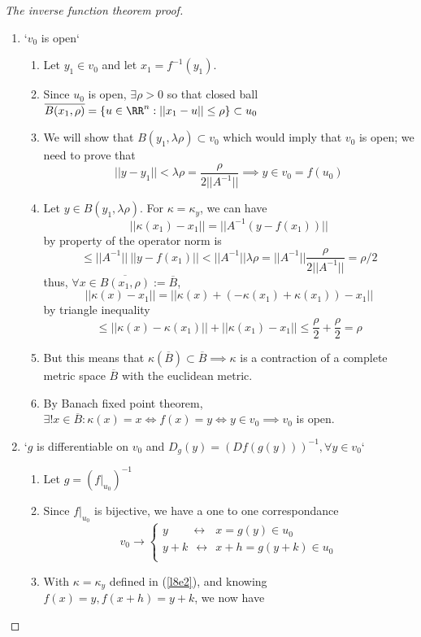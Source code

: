 \begin{proof}[The inverse function theorem proof]
\begin{enumerate}[I]
  \item `$v_0$ is open`
    \begin{enumerate}
    \item Let $y_1 \in v_0$ and let $x_1 = f^{-1}(y_1)$.
    \item Since $u_0$ is open, $\exists \rho > 0$ so that closed ball $\overline{B(x_1, \rho)} = \{u\in \RR^n:||x_1-u|| \leq \rho\} \subset u_0$
    \item We will show that $B(y_1, \lambda \rho) \subset v_0$ which would imply that $v_0$ is open; we need to prove that
      $$||y - y_1|| < \lambda \rho = \frac{\rho}{2||A^{-1}||} \implies y\in v_0 = f(u_0)$$
    \item Let $y \in B(y_1, \lambda \rho)$. For $\kappa = \kappa_y$, we can have
      $$||\kappa(x_1) - x_1|| = ||A^{-1}(y-f(x_1))||$$
      by property of the operator norm is
      $$\leq ||A^{-1}||\ ||y-f(x_1)|| < ||A^{-1}||\lambda \rho = ||A^{-1}||\frac{\rho}{2||A^{-1}||} = \rho / 2 $$
      thus, $\forall x \in \overline{B(x_1, \rho)} := \overline{B}$,
      $$||\kappa(x)-x_1|| = ||\kappa(x) + (-\kappa(x_1) + \kappa(x_1)) - x_1||$$
      by triangle inequality
      $$\leq ||\kappa(x) - \kappa(x_1)|| + ||\kappa(x_1) - x_1|| \leq \frac{\rho}{2} + \frac{\rho}{2} = \rho$$
    \item But this means that $\kappa(\overline{B}) \subset \overline{B} \implies \kappa$ is a contraction of a complete metric space $\overline{B}$ with the euclidean metric.
    \item By Banach fixed point theorem, $\exists ! x \in \overline{B} : \kappa(x) = x \iff f(x) = y \iff y \in v_0 \implies v_0$ is open.
    \end{enumerate}
  \item `$g$ is differentiable on $v_0$ and $D_g(y) = (Df(g(y)))^{-1}, \forall y \in v_0$`
    \begin{enumerate}
    \item Let $g = (f|_{u_0})^{-1}$
    \item Since $f|_{u_0}$ is bijective, we have a one to one correspondance
      $$v_0 \rightarrow
      \begin{cases}
        y \phantom{+ k}\:\:\:\leftrightarrow\:\:\: x = g(y) \in u_0 \\
        y + k \:\:\leftrightarrow\:\: x + h = g(y+k) \in u_0 \\
      \end{cases}
      $$
    \item With $\kappa=\kappa_y$ defined in (\ref{l8e2}), and knowing $f(x) = y, f(x+h) = y+k$, we now have

\end{enumerate}
\end{enumerate}
\end{proof}
